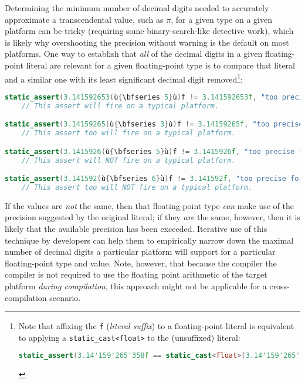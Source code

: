 Determining the minimum number of decimal digits needed to accurately
approximate a transcendental value, such as $\pi$, for a given type on
a given platform can be tricky (requiring some binary-search-like
detective work), which is likely why overshooting the precision without
warning is the default on most platforms. One way to establish that
\emph{all} of the decimal digits in a given floating-point literal are
relevant for a given floating-point type is to compare that literal and
a similar one with its least significant decimal digit
removed{\cprotect\footnote{Note that affixing the \lstinline!f!
(\emph{literal suffix}) to a floating-point literal is
equivalent to applying a \lstinline!static_cast<float>! to the
(unsuffixed) literal:

\begin{lstlisting}[language=C++, basicstyle={\ttfamily\footnotesize}]
static_assert(3.14'159'265'358f == static_cast<float>(3.14'159'265'358));
\end{lstlisting}\vspace*{-1ex}
      }}:

\begin{lstlisting}[language=C++]
static_assert(3.141592653(ù{\bfseries 5}ù)f != 3.141592653f, "too precise for float");
    // This assert will fire on a typical platform.

static_assert(3.14159265(ù{\bfseries 3}ù)f != 3.14159265f, "too precise for float");
    // This assert too will fire on a typical platform.

static_assert(3.1415926(ù{\bfseries 5}ù)f != 3.1415926f, "too precise for float");
    // This assert will NOT fire on a typical platform.

static_assert(3.141592(ù{\bfseries 6}ù)f != 3.141592f, "too precise for float");
    // This assert too will NOT fire on a typical platform.
\end{lstlisting}
    
\noindent If the values are \emph{not} the same, then that floating-point type
\emph{can} make use of the precision suggested by the original literal; if
they \emph{are} the same, however, then it is likely that the available
precision has been exceeded. Iterative use of this technique by
developers can help them to empirically narrow down the maximal number
of decimal digits a particular platform will support for a particular
floating-point type and value. Note, however, that because the compiler the compiler is not required to use the floating point arithmetic of the target platform \emph{during compilation}, this approach might not be applicable for a cross-compilation scenario.

